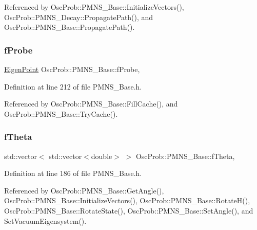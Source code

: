 Referenced by Osc\+Prob\+::\+P\+M\+N\+S\+\_\+\+Base\+::\+Initialize\+Vectors(), Osc\+Prob\+::\+P\+M\+N\+S\+\_\+\+Decay\+::\+Propagate\+Path(), and Osc\+Prob\+::\+P\+M\+N\+S\+\_\+\+Base\+::\+Propagate\+Path().

\mbox{\label{classOscProb_1_1PMNS__Base_ab1fe4800ee3ae48df4fc942dce00e0d3}} 
\subsubsection{\texorpdfstring{f\+Probe}{fProbe}}
{\footnotesize\ttfamily \hyperlink{structOscProb_1_1EigenPoint}{Eigen\+Point} Osc\+Prob\+::\+P\+M\+N\+S\+\_\+\+Base\+::f\+Probe\hspace{0.3cm}{\ttfamily [protected]}, {\ttfamily [inherited]}}



Definition at line 212 of file P\+M\+N\+S\+\_\+\+Base.\+h.



Referenced by Osc\+Prob\+::\+P\+M\+N\+S\+\_\+\+Base\+::\+Fill\+Cache(), and Osc\+Prob\+::\+P\+M\+N\+S\+\_\+\+Base\+::\+Try\+Cache().

\mbox{\label{classOscProb_1_1PMNS__Base_a1976887cd658dd86b2336c181f1470b4}} 
\subsubsection{\texorpdfstring{f\+Theta}{fTheta}}
{\footnotesize\ttfamily std\+::vector$<$ std\+::vector$<$double$>$ $>$ Osc\+Prob\+::\+P\+M\+N\+S\+\_\+\+Base\+::f\+Theta\hspace{0.3cm}{\ttfamily [protected]}, {\ttfamily [inherited]}}



Definition at line 186 of file P\+M\+N\+S\+\_\+\+Base.\+h.



Referenced by Osc\+Prob\+::\+P\+M\+N\+S\+\_\+\+Base\+::\+Get\+Angle(), Osc\+Prob\+::\+P\+M\+N\+S\+\_\+\+Base\+::\+Initialize\+Vectors(), Osc\+Prob\+::\+P\+M\+N\+S\+\_\+\+Base\+::\+Rotate\+H(), Osc\+Prob\+::\+P\+M\+N\+S\+\_\+\+Base\+::\+Rotate\+State(), Osc\+Prob\+::\+P\+M\+N\+S\+\_\+\+Base\+::\+Set\+Angle(), and Set\+Vacuum\+Eigensystem().

